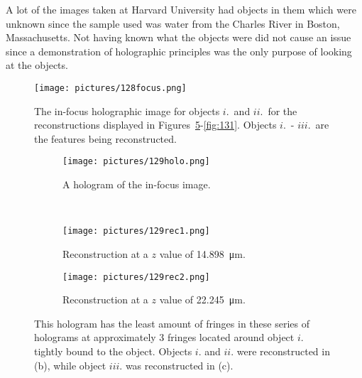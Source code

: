 A lot of the images taken at Harvard University had objects in them which were
unknown since the sample used was water from the Charles River in Boston,
Massachusetts. Not
having known what the objects were did not cause an issue since
a demonstration of holographic principles was the only purpose of looking at the objects.


\begin{figure}
    \begin{center}
        \texttt{[image: pictures/128focus.png]}
        \caption{The in-focus holographic image for objects $i.$\ and  $ii.$\
            for the reconstructions
            displayed in Figures~\ref{fig:129}-\ref{fig:131}.
    Objects $i.$\ - $iii.$\ are the features being reconstructed. }
        \label{fig:128focus}
    \end{center}
\end{figure}


\begin{figure}[ht!]
    \begin{center}

        \begin{subfigure}[t]{0.4\textwidth}
            \label{fig:129holo}
            \texttt{[image: pictures/129holo.png]}
            \caption{A hologram of the in-focus image.}
        \end{subfigure}
        \\
        \begin{subfigure}[t]{0.4\textwidth}
            \label{fig:129rec1}
            \texttt{[image: pictures/129rec1.png]}
            \caption{Reconstruction at a $z$ value of \SI{14.898}{\micro\meter}.}
        \end{subfigure}
                \hspace*{\fill}
%
        \begin{subfigure}[t]{0.4\textwidth}
            \label{fig:129rec2}
            \texttt{[image: pictures/129rec2.png]}
            \caption{Reconstruction at a $z$ value of \SI{22.245}{\micro\meter}.}
        \end{subfigure}


    \end{center}
    \caption{%
        This hologram has the least amount of fringes in these series of
        holograms at approximately 3 fringes located around object $i.$ tightly
        bound to the object. 
        Objects $i.$ and $ii.$ were reconstructed in (b),
        while object $iii.$ was reconstructed in (c).
    }%
    \label{fig:129}
\end{figure}


